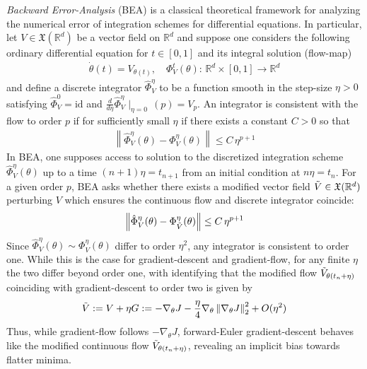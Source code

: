 \documentclass[reqno,11pt,letterpaper]{amsart}
\theoremstyle{plain}
\theoremstyle{definition}
\theoremstyle{remark}
\begin{document}
\emph{Backward Error-Analysis} (BEA) \cite{Reich1999} is a classical theoretical framework for analyzing the numerical error of integration schemes for differential equations. In particular, let $V \in \mathfrak{X}(\mathbb{R}^{d})$ be a vector field on $\mathbb{R}^{d}$ and suppose one considers the following ordinary differential equation for $t\in[0,1]$ and its integral solution (flow-map)
\begin{align}
    \dot{\theta}(t)  = V_{\theta(t)}, \quad \Phi_{V}^{t}(\theta):\, \mathbb{R}^{d} \times [0,1] \to \mathbb{R}^{d}
\end{align}
and define a discrete integrator $\hat{\Phi}_{V}^{\eta}$ \cite{CHansen2011} to be a function smooth in the step-size $\eta > 0$ satisfying $\hat{\Phi}_{V}^{0} = \mathrm{id}$ and $\frac{d}{d\eta}\hat{\Phi}_{V}^{\eta} \mid_{\eta=0}\,(p) = V_{p}$. An integrator is consistent with the flow to order $p$ if for sufficiently small $\eta$ if there exists a constant $C > 0$ so that
\begin{align}
\left\lVert
\hat{\Phi}_{V}^{\eta}(\theta) - \Phi_{V}^{\eta}(\theta)
    \right\rVert \leq C \, \eta^{p+1}
\end{align}
In BEA, one supposes access to solution to the discretized integration scheme $\hat{\Phi}_{V}^{\eta}(\theta)$ up to a time $(n+1)\eta=t_{n+1}$ from an initial condition at $n\eta=t_{n}$. For a given order $p$, BEA asks whether there exists a modified vector field $\Tilde{V} \in \mathfrak{X}(\mathbb{R}^{d})$ perturbing $V$ which ensures the continuous flow and discrete integrator coincide: \begin{align}\label{eq:backward_error_integrator_diff}
\left\lVert
\hat{\Phi}_{V}^{\eta}(\theta) - \Phi_{\Tilde{V}}^{\eta}(\theta)
\right\rVert \leq C \,\eta^{p+1}\end{align}
Since $\hat{\Phi}_{V}^{\eta}(\theta) \sim \Phi_{V}^{\eta}(\theta)$ differ to order $\eta^{2}$, any integrator is consistent to order one. While this is the case for gradient-descent and gradient-flow, for any finite $\eta$ the two differ beyond order one, with \cite{barrett2021implicit} identifying that the modified flow $\Tilde{V}_{\theta(t_{n}+\eta)}$ coinciding with gradient-descent to order two is given by
\begin{align}\label{eq:Corrected_ODE}
\Tilde{V} := 
{V} + \eta G:= - \nabla_{\theta} J - \frac{\eta}{4} \nabla_{\theta}\left\lVert \nabla_{\theta} J \right\rVert_{2}^{2} + O(\eta^{2})
\end{align}
Thus, while gradient-flow follows $- \nabla_{\theta} J$, forward-Euler gradient-descent behaves like the modified continuous flow $\Tilde{V}_{\theta(t_{n}+\eta)}$, revealing an implicit bias towards flatter minima.
\end{document}
